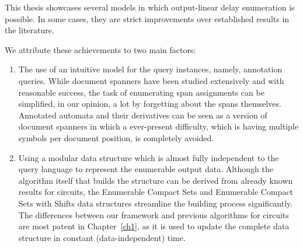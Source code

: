 This thesis showcases several models in which output-linear delay enumeration is possible. In some cases, they are strict improvements over established results in the literature.

We attribute these achievements to two main factors:

\begin{enumerate}
	\item The use of an intuitive model for the query instances, namely, annotation queries. While document spanners have been studied extensively and with reasonable success, the task of enumerating span assignments can be simplified, in our opinion, a lot by forgetting about the spans themselves. Annotated automata and their derivatives can be seen as a version of document spanners in which a ever-present difficulty, which is having multiple symbols per document position, is completely avoided.
	\item Using a modular data structure which is almost fully independent to the query language to represent the enumerable output data. Although the algorithm itself that builds the structure can be derived from already known results for circuits, the Enumerable Compact Sets and Enumerable Compact Sets with Shifts data structures streamline the building process significantly. The differences between our framework and previous algorithms for circuits are most patent in Chapter~\ref{ch1}, as it is used to update the complete data structure in constant (data-independent) time.
\end{enumerate}